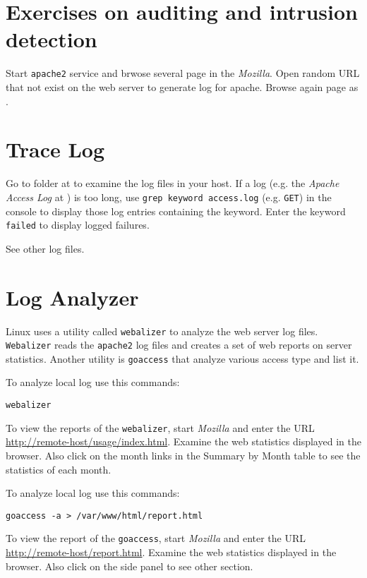 \documentclass{../UTNetLab}
\begin{document}
\section*{Exercises on auditing and intrusion detection}
	Start \lstinline{apache2} service and brwose several page in the \textit{Mozilla}. Open random URL that not exist on the web server to generate log for apache. Browse again page as .

\section{Trace Log}
	Go to  folder at  to examine the log files in your host. If a log (e.g. the \textit{Apache Access Log} at ) is too long, use \lstinline[emph={keyword}]{grep keyword access.log} (e.g. \texttt{GET}) in the {console} to display those log entries containing the keyword. Enter the keyword \texttt{failed} to display logged failures.

	See other log files.

\section{Log Analyzer}
	Linux uses a utility called \lstinline{webalizer} to analyze the web server log files. \lstinline{Webalizer} reads the \lstinline{apache2} log files and creates a set of web reports on server statistics. Another utility is \lstinline{goaccess} that analyze various access type and list it.

	To analyze local log use this commands:
	\begin{lstlisting}
webalizer
	\end{lstlisting}
	
	To view the reports of the \lstinline{webalizer}, start \textit{Mozilla} and enter the URL \url{http://remote-host/usage/index.html}. Examine the web statistics displayed in the browser. Also click on the month links in the Summary by Month table to see the statistics of each month.

	To analyze local log use this commands:
	\begin{lstlisting}
goaccess -a > /var/www/html/report.html
	\end{lstlisting}
	
	To view the report of the \lstinline{goaccess}, start \textit{Mozilla} and enter the URL \url{http://remote-host/report.html}. Examine the web statistics displayed in the browser. Also click on the side panel to see other section.
\end{document}
